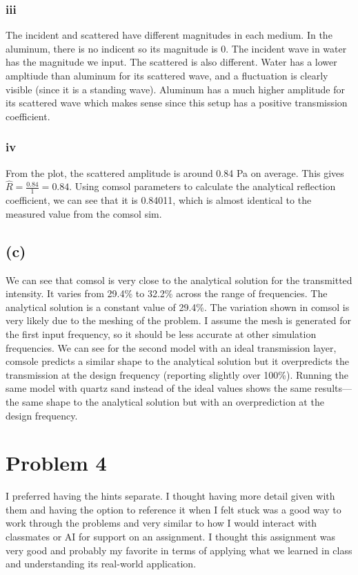 \documentclass[12 pt]{article}
\begin{document}
\subsubsection*{iii}
The incident and scattered have different magnitudes in each medium. In the aluminum, there is no indicent so its
magnitude is 0. The incident wave in water has the magnitude we input. The scattered is also different. Water has a
lower ampltiude than aluminum for its scattered wave, and a fluctuation is clearly visible (since it is a standing
wave). Aluminum has a much higher amplitude for its scattered wave which makes sense since this setup has a positive
transmission coefficient.

\subsubsection*{iv}
From the plot, the scattered amplitude is around 0.84 Pa on average. This gives $\hat{R}=\frac{0.84}{1}=0.84$. Using
comsol parameters to calculate the analytical reflection coefficient, we can see that it is 0.84011, which is almost
identical to the measured value from the comsol sim.

\subsection*{(c)}
We can see that comsol is very close to the analytical solution for the transmitted intensity. It varies from 29.4\% to
32.2\% across the range of frequencies. The analytical solution is a constant value of 29.4\%. The variation shown in
comsol is very likely due to the meshing of the problem. I assume the mesh is generated for the first input frequency, so
it should be less accurate at other simulation frequencies. We can see for the second model with an ideal transmission
layer, comsole predicts a similar shape to the analytical solution but it overpredicts the transmission at the design
frequency (reporting slightly over 100\%). Running the same model with quartz sand instead of the ideal values shows the
same results---the same shape to the analytical solution but with an overprediction at the design frequency.

\section*{Problem 4}
I preferred having the hints separate. I thought having more detail given with them and having the option to reference
it when I felt stuck was a good way to work through the problems and very similar to how I would interact with
classmates or AI for support on an assignment. I thought this assignment was very good and probably my favorite in terms
of applying what we learned in class and understanding its real-world application.
\end{document}
